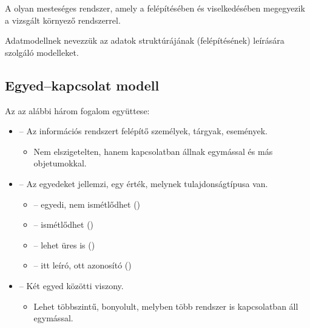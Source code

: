 \documentclass[../../main.tex]{subfiles}
\begin{document}
A  olyan mesteséges rendszer, amely a felépítésében és
viselkedésében megegyezik a vizsgált környező rendszerrel.

Adatmodellnek nevezzük az adatok struktúrájának (felépítésének) leírására
szolgáló modelleket.

\subsection{Egyed--kapcsolat modell}

Az  az alábbi három fogalom együttese:
\begin{itemize}
  \item {} -- Az információs rendszert felépítő személyek,
        tárgyak, események.
        \begin{itemize}
          \item Nem elszigetelten, hanem kapcsolatban állnak
                egymással és más objetumokkal.
        \end{itemize}

  \item {} -- Az egyedeket jellemzi, egy érték,
        melynek tulajdonságtípusa van.
        \begin{itemize}
          \item {}
                \tabto{5.5cm} – \tabto{6.5cm}
                egyedi, nem ismétlődhet ()

          \item {}
                \tabto{5.5cm} – \tabto{6.5cm}
                ismétlődhet ()

          \item {}
                \tabto{5.5cm} – \tabto{6.5cm}
                lehet üres is ()

          \item {}
                \tabto{5.5cm} – \tabto{6.5cm}
                itt leíró, ott azonosító ()
        \end{itemize}

  \item {} -- Két egyed közötti viszony.
        \begin{itemize}
          \item Lehet többszintű, bonyolult, melyben
                több rendszer is kapcsolatban áll egymással.
        \end{itemize}
\end{itemize}
\end{document}
